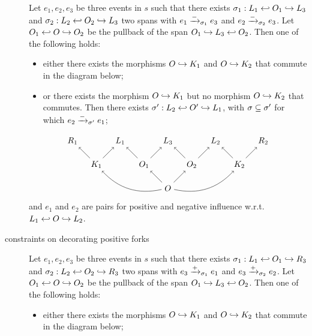 \begin{definition}
\begin{description}
    Let $e_1,e_2,e_3$ be three events in $s$ such that there exists $\sigma_1:L_1\hookleftarrow O_1\hookrightarrow L_3$ and $\sigma_2:L_2\hookleftarrow O_2\hookrightarrow L_3$ two spans with $e_1\mathrel{\xrightarrow{-}}_{\sigma_1} e_3$ and $e_2\mathrel{\xrightarrow{-}}_{\sigma_2} e_3$.
    Let $O_1\hookleftarrow O\hookrightarrow O_2$ be the pullback of the span $O_1\hookrightarrow L_3 \hookleftarrow O_2$. Then one of the following holds:
    \begin{itemize}
    \item either there exists the morphisms $O\hookrightarrow K_1$ and $O\hookrightarrow K_2$ that commute in the diagram below;
    \item or there exists the morphism $O\hookrightarrow K_1$ but no morphism $O\hookrightarrow K_2$ that commutes. Then there exists $\sigma':L_2\hookleftarrow O'\hookrightarrow L_1$, with $\sigma\subseteq \sigma'$ for which $e_2\mathrel{\xrightarrow{-}}_{\sigma'} e_1$; %
    \end{itemize}
   \[
    \begin{tikzpicture} %
      \node (o) at (0,-1) {\(O\)};
      \node (r3) at (0,1) {\(L_3\)};
      \node (o1) at (-1,0) {\(O_1\)};
      \node (o2) at (1,0) {\(O_2\)};
      \node (r1) at (-2,1) {\(L_1\)};
      \node (r2) at (2,1) {\(L_2\)};
      \node (l1) at (-4,1) {\(R_1\)};
      \node (l2) at (4,1) {\(R_2\)};
      \node (k1) at (-3,0) {\(K_1\)};
      \node (k2) at (3,0) {\(K_2\)};
      \draw [->] (o) -- (o1);
      \draw [->] (o) -- (o2);
      \draw [->] (o1) -- (r3);
      \draw [->] (o2) -- (r3);
      \draw [->] (o1) -- (r1);
      \draw [->] (o2) -- (r2);
      \draw [->] (k1) -- (r1);
      \draw [->] (k2) -- (r2);
      \draw [->] (k1) -- (l1);
      \draw [->] (k2) -- (l2);
      \draw [->] (o) to [bend left] (k1);
      \draw [->] (o) to [bend right] (k2);
    \end{tikzpicture}
    \]
    and $e_1$ and $e_2$ are pairs for positive and negative influence w.r.t. $L_1\hookleftarrow O\hookrightarrow L_2$.
  \item[constraints on decorating positive forks]
    Let $e_1,e_2,e_3$ be three events in $s$ such that there exists $\sigma_1:L_1\hookleftarrow O_1\hookrightarrow R_3$ and $\sigma_2:L_2\hookleftarrow O_2\hookrightarrow R_3$ two spans with $e_3\mathrel{\xrightarrow{+}}_{\sigma_1} e_1$ and $e_3\mathrel{\xrightarrow{+}}_{\sigma_2} e_2$.
    Let $O_1\hookleftarrow O\hookrightarrow O_2$ be the pullback of the span $O_1\hookrightarrow L_3 \hookleftarrow O_2$. Then one of the following holds:
    \begin{itemize}
    \item either there exists the morphisms $O\hookrightarrow K_1$ and $O\hookrightarrow K_2$ that commute in the diagram below;

\end{itemize}
\end{description}
\end{definition}
